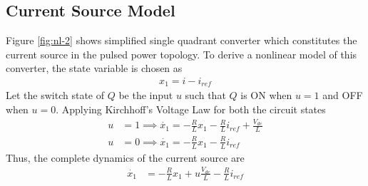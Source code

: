\subsection{Current Source Model}
    Figure \ref{fig:nl-2} shows simplified single quadrant converter which constitutes the current source in the pulsed power topology. To derive a nonlinear model of this converter, the state variable is chosen as
    \begin{align*}
    	x_1 = i - i_{ref}
    \end{align*}
    Let the switch state of $Q$ be the input $u$ such that $Q$ is ON when $u = 1$ and OFF when $u = 0$. Applying Kirchhoff's Voltage Law for both the circuit states
    \begin{align*}
        u &= 1 \implies \dot{x_1} = -\frac{R}{L}x_1 -\frac{R}{L}i_{ref} + \frac{V_{dc}}{L}\\
        u &= 0 \implies \dot{x_1} = -\frac{R}{L}x_1 -\frac{R}{L}i_{ref}
    \end{align*}
    Thus, the complete dynamics of the current source are
    \begin{align}
        \dot{x_1} &= -\frac{R}{L}x_1 + u\frac{V_{dc}}{L} -\frac{R}{L}i_{ref}
        \label{eq:nl2}
    \end{align}
